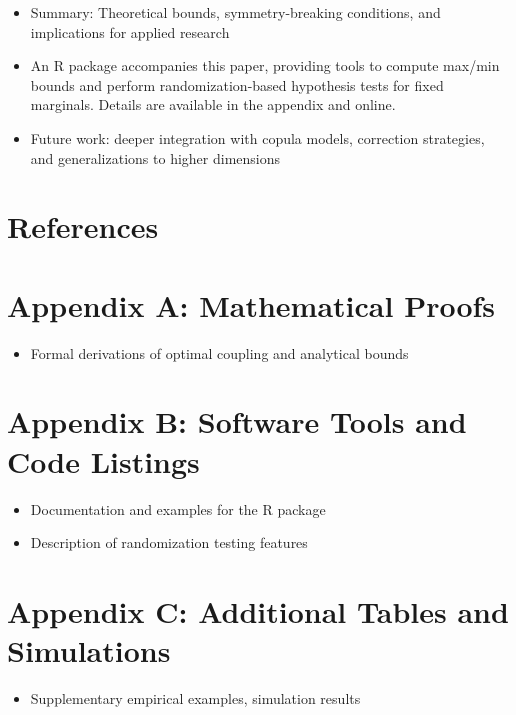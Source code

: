 \documentclass[
  12pt,
]{article}
\providecommand{\tightlist}{%
  \setlength{\itemsep}{0pt}\setlength{\parskip}{0pt}}\usepackage{longtable,booktabs,array}
\begin{document}
\begin{itemize}
\tightlist
\item
  Summary: Theoretical bounds, symmetry-breaking conditions, and
  implications for applied research\\
\item
  An R package accompanies this paper, providing tools to compute
  max/min bounds and perform randomization-based hypothesis tests for
  fixed marginals. Details are available in the appendix and online.\\
\item
  Future work: deeper integration with copula models, correction
  strategies, and generalizations to higher dimensions
\end{itemize}

\newpage

\section*{References}\label{references}

\newpage

\section{Appendix A: Mathematical
Proofs}\label{appendix-a-mathematical-proofs}

\begin{itemize}
\tightlist
\item
  Formal derivations of optimal coupling and analytical bounds
\end{itemize}

\section{Appendix B: Software Tools and Code
Listings}\label{appendix-b-software-tools-and-code-listings}

\begin{itemize}
\tightlist
\item
  Documentation and examples for the R package\\
\item
  Description of randomization testing features
\end{itemize}

\section{Appendix C: Additional Tables and
Simulations}\label{appendix-c-additional-tables-and-simulations}

\begin{itemize}
\tightlist
\item
  Supplementary empirical examples, simulation results
\end{itemize}
\end{document}
